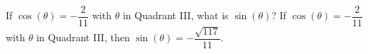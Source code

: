 {If $\cos(\theta) = -\dfrac{2}{11}$ with $\theta$ in Quadrant III, what is $\sin(\theta)$?}
{If $\cos(\theta) = -\dfrac{2}{11}$ with $\theta$ in Quadrant III, then $\sin(\theta) = -\dfrac{\sqrt{117}}{11}$.}